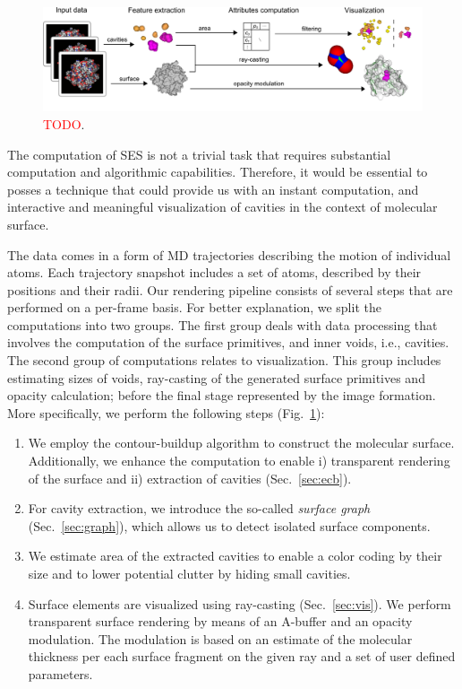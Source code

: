 \begin{figure}[tb]
  \centering
  \includegraphics[width=\textwidth]{image/overview.png}
  \caption{\textcolor{red}{TODO}.}
	\label{fig:overview}
\end{figure}

The computation of SES is not a trivial task that requires substantial computation and algorithmic capabilities. 
Therefore, it would be essential to posses a technique that could provide us with an instant computation, and interactive and meaningful visualization of cavities in the context of molecular surface.

The data comes in a form of MD trajectories describing the motion of individual atoms. 
Each trajectory snapshot includes a set of atoms, described by their positions and their radii. 
Our rendering pipeline consists of several steps that are performed on a per-frame basis. 
For better explanation, we split the computations into two groups. 
The first group deals with data processing that involves the computation of the surface primitives, and inner voids, i.e., cavities.
The second group of computations relates to visualization. 
This group includes estimating sizes of voids, ray-casting of the generated surface primitives and opacity calculation; before the final stage represented by the image formation. More specifically, we perform the following steps (Fig.~\ref{fig:overview}):
	\begin{enumerate}
	  \item We employ the contour-buildup algorithm to construct the molecular surface. Additionally, we enhance the computation to enable i) transparent rendering of the surface and ii) extraction of cavities (Sec.~\ref{sec:ecb}).
		\item For cavity extraction, we introduce the so-called \textit{surface graph} (Sec.~\ref{sec:graph}), which allows us to detect isolated surface components.
		\item We estimate area of the extracted cavities to enable a color coding by their size and to lower potential clutter by hiding small cavities.
		\item Surface elements are visualized using ray-casting (Sec.~\ref{sec:vis}). We perform transparent surface rendering by means of an A-buffer and an opacity modulation. The modulation is based on an estimate of the molecular thickness per each surface fragment on the given ray and a set of user defined parameters.
	\end{enumerate}